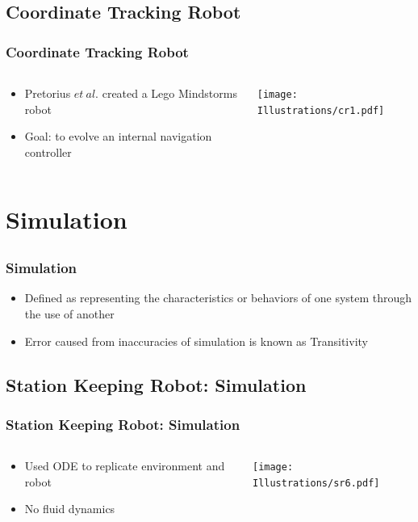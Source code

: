 \documentclass{beamer}
\begin{document}
\subsection{Coordinate Tracking Robot}
\begin{frame}
  \frametitle{Coordinate Tracking Robot}
\begin{columns}
  \begin{column}{0.5\textwidth}
\begin{itemize}
\item  Pretorius $et~al.$ created a Lego Mindstorms robot
\item Goal: to evolve an internal navigation controller
\end{itemize}
\end{column}
\begin{column}{0.5\textwidth}
 \texttt{[image: Illustrations/cr1.pdf]}
       \\
\end{column}
\end{columns}
\end{frame}

\section{Simulation}

\subsection{}
\begin{frame}
\frametitle{Simulation}
\begin{itemize}
\item Defined as representing the characteristics or behaviors of one system through the use of another
\item Error caused from inaccuracies of simulation is known as Transitivity 
\end{itemize}
\end{frame}

\subsection{Station Keeping Robot: Simulation}
\begin{frame}
  \frametitle{Station Keeping Robot: Simulation}
\begin{columns}
  \begin{column}{0.5\textwidth}
\begin{itemize}
\item  Used ODE to replicate environment and robot
\item  No fluid dynamics
\end{itemize}
\end{column}
\begin{column}{0.5\textwidth}
 \texttt{[image: Illustrations/sr6.pdf]}
       \\
\end{column}
\end{columns}
\end{frame}
\end{document}
